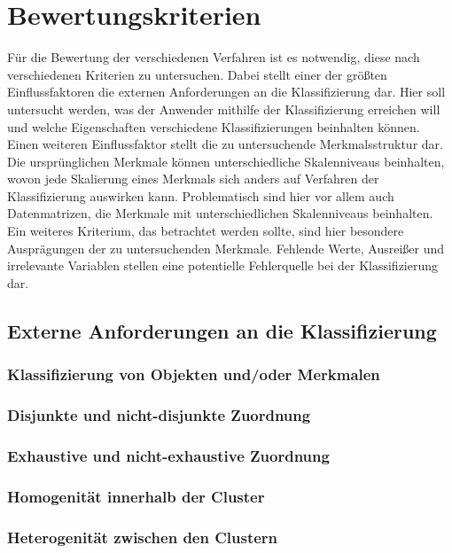 \chapter{Bewertungskriterien}

Für die Bewertung der verschiedenen Verfahren ist es notwendig, diese nach verschiedenen Kriterien zu untersuchen. Dabei stellt einer der größten Einflussfaktoren die externen Anforderungen an die Klassifizierung dar. Hier soll untersucht werden, was der Anwender mithilfe der Klassifizierung erreichen will und welche Eigenschaften verschiedene Klassifizierungen beinhalten können. \\
Einen weiteren Einflussfaktor stellt die zu untersuchende Merkmalsstruktur dar. Die ursprünglichen Merkmale können unterschiedliche Skalenniveaus beinhalten, wovon jede Skalierung eines Merkmals sich anders auf Verfahren der Klassifizierung auswirken kann. Problematisch sind hier vor allem auch Datenmatrizen, die Merkmale mit unterschiedlichen Skalenniveaus beinhalten. \\
Ein weiteres Kriterium, das betrachtet werden sollte, sind hier besondere Ausprägungen der zu untersuchenden Merkmale. Fehlende Werte, Ausreißer und irrelevante Variablen stellen eine potentielle Fehlerquelle bei der Klassifizierung dar.

\section{Externe Anforderungen an die Klassifizierung}
\subsection{Klassifizierung von Objekten und/oder Merkmalen}
\subsection{Disjunkte und nicht-disjunkte Zuordnung}
\subsection{Exhaustive und nicht-exhaustive Zuordnung}
\subsection{Homogenität innerhalb der Cluster}
\subsection{Heterogenität zwischen den Clustern}


